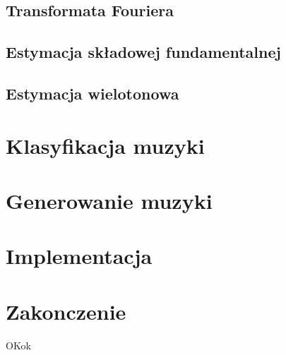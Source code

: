 \documentclass[12pt,a4paper,twoside]{mwart}
\begin{document}
\subsection{Transformata Fouriera}

\subsection{Estymacja składowej fundamentalnej}

\subsection{Estymacja wielotonowa}


\newpage
\section{Klasyfikacja muzyki}

\section{Generowanie muzyki}

\section{Implementacja}

\section{Zakonczenie}

OKok
\end{document}
